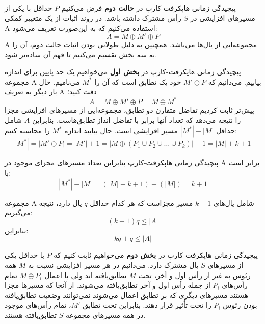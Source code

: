 \begin{itemframe}{‌پیچیدگی زمانی هاپکرفت-کارپ}
\itm
در \textbf{حالت دوم} فرض می‌کنیم $P$ حداقل با یکی از مسیرهای افزایشی در $S$ رأس مشترک داشته باشد.
\itm
در روند اثبات از یک متغییر کمکی A استفاده می‌کنیم که به این‌صورت تعریف می‌شود:
$$
A = M \oplus M' \oplus P
$$
A
 مجموعه‌ایی از یال‌ها می‌باشد.
\itm
همچنین به دلیل طولانی بودن اثبات حالت دوم، آن را به سه بخش تقسیم می‌کنیم تا فهم آن ساده‌تر شود.
\end{itemframe}

\begin{itemframe}{‌پیچیدگی زمانی هاپکرفت-کارپ}
\itm
در \textbf{بخش اول} می‌خواهیم یک حد پایین برای اندازه مجموعه A بیابیم.
\itm
می‌دانیم که $M' \oplus P$ خود یک تطابق است که آن را $M^*$ می‌نامیم. حال بار دیگر به تعریف A دقت کنید؛
$$
A = M \oplus M' \oplus P = M \oplus M^*
$$
\itm
پیش‌تر ثابت کردیم تفاضل متقارن دو تطابق، مجموعه‌ایی از مسیر‌های افزایشی مجزا را نتیجه می‌دهد که تعداد آنها برابر با تفاضل انداز تطابق‌هاست. بنابراین $A$ شامل حداقل $|M^*| - |M|$ مسیر افزایشی است.
\itm
 حال بیایید اندازه $M^*$ را محاسبه کنیم:
$$
|M^*| =  |M' \oplus P| = |M'| + 1 = |M \oplus (P_1 \cup P_2 \cup \dots \cup P_k)| + 1= |M| + k + 1
$$
\end{itemframe}

\begin{itemframe}{‌پیچیدگی زمانی هاپکرفت-کارپ}
\itm
بنابراین تعداد مسیرهای مجزای موجود در A برابر است با:
$$
|M^*| - |M| = (|M| + k + 1) - (|M|) = k + 1
$$

\itm
مجموعه A شامل یال‌های
$k + 1$
مسیر مجزاست که هر کدام حداقل $q$ یال دارد، نتیجه می‌گیریم:
$$
(k + 1)q \leq |A|
$$
بنابراین:
$$
kq + q \leq |A|
$$
\end{itemframe}

\begin{itemframe}{‌پیچیدگی زمانی هاپکرفت-کارپ}
\itm
در \textbf{بخش دوم } می‌خواهیم ثابت کنیم که $P$ با حداقل یکی از مسیرهای $S$ یال مشترک دارد.
\itm
می‌دانیم در هر مسیر افزایشی نسبت به $M$ همه رئوس به غیر از رأس اول و آخر، تحت $M$ تطابق‌یافته اند ولی با اعمال
$M \oplus P_i$
 تمام رأس‌های $P_i$ از جمله رأس اول و آخر تطابق‌یافته می‌شوند.
\itm
 از آنجا که مسیرها مجزا هستند مسیرهای دیگری که بر تطابق اعمال می‌شوند نمی‌توانند وضعیت تطابق‌یافته بودن رئوس $P_i$ را تحت تأثیر قرار دهند.
\itm
 بنابراین تحت تطابق $M'$، تمام رأس‌های موجود در همه مسیرهای مجموعه $S$ تطابق‌یافته هستند.
\end{itemframe}

